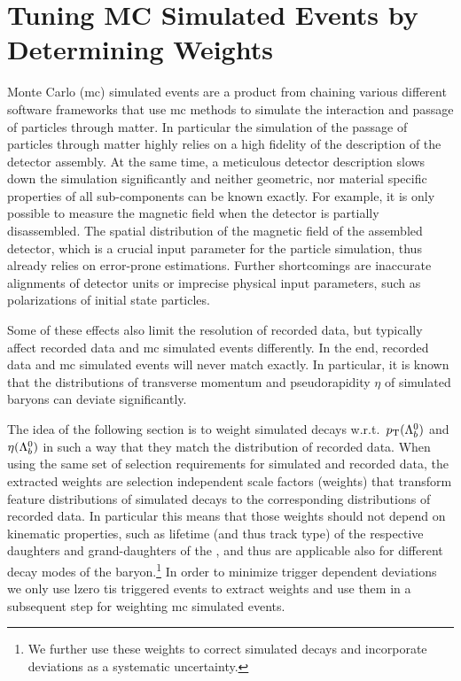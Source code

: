 \chapter{Tuning MC Simulated Events by Determining Weights}
\label{chap:weights}
Monte Carlo (\gls{mc}) simulated events are a product from chaining various different software frameworks that use \gls{mc} methods to simulate the interaction and passage of particles through matter.
In particular the simulation of the passage of particles through matter highly relies on a high fidelity of the description of the detector assembly.
At the same time, a meticulous detector description slows down the simulation significantly and neither geometric, nor material specific properties of all sub-components can be known exactly.
For example, it is only possible to measure the magnetic field when the detector is partially disassembled.
The spatial distribution of the magnetic field of the assembled detector, which is a crucial input parameter for the particle simulation, thus already relies on error-prone estimations.
Further shortcomings are inaccurate alignments of detector units or imprecise physical input parameters, such as polarizations of initial state particles.

Some of these effects also limit the resolution of recorded data, but typically affect recorded data and \gls{mc} simulated events differently.
In the end, recorded data and \gls{mc} simulated events will never match exactly.
In particular, it is known that the distributions of transverse momentum \pt and pseudorapidity $\eta$ of simulated \Lb baryons can deviate significantly.

The idea of the following section is to weight simulated \Lb decays w.r.t.\ $\mbox{$p_{\mathrm{ T}}$}({{\Lambda}^0_{b}})$ and $\eta({{\Lambda}^0_{b}})$ in such a way that they match the distribution of recorded data.
When using the same set of selection requirements for simulated and recorded data, the extracted weights are selection independent scale factors (weights) that transform feature distributions of simulated \Lb decays to the corresponding distributions of recorded data.
In particular this means that those weights should not depend on kinematic properties, such as lifetime (and thus track type) of the respective daughters and grand-daughters of the \Lb, and thus are applicable also for different decay modes of the \Lb baryon.\footnote{We further use these weights to correct simulated \Xibz decays and incorporate deviations as a systematic uncertainty.}
In order to minimize trigger dependent deviations we only use \gls{lzero} \gls{tis} triggered \decay{\Lb}{\jpsi\Lz} events to extract weights and use them in a subsequent step for weighting \gls{mc} simulated \decay{\Lb/\Xibz}{\Dz\Lz} events.

